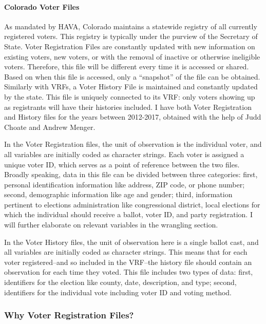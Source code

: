 \documentclass[]{article}
\let\oldparagraph\paragraph
\renewcommand{\paragraph}[1]{\oldparagraph{#1}\mbox{}}
\begin{document}
\paragraph{Colorado Voter Files}\label{colorado-voter-files}

As mandated by HAVA, Colorado maintains a statewide registry of all
currently registered voters. This registry is typically under the
purview of the Secretary of State. Voter Registration Files are
constantly updated with new information on existing voters, new voters,
or with the removal of inactive or otherwise ineligible voters.
Therefore, this file will be different every time it is accessed or
shared. Based on when this file is accessed, only a ``snapshot'' of the
file can be obtained. Similarly with VRFs, a Voter History File is
maintained and constantly updated by the state. This file is uniquely
connected to its VRF: only voters showing up as registrants will have
their histories included. I have both Voter Registration and History
files for the years between 2012-2017, obtained with the help of Judd
Choate and Andrew Menger.

In the Voter Registration files, the unit of observation is the
individual voter, and all variables are initially coded as character
strings. Each voter is assigned a unique voter ID, which serves as a
point of reference between the two files. Broadly speaking, data in this
file can be divided between three categories: first, personal
identification information like address, ZIP code, or phone number;
second, demographic information like age and gender; third, information
pertinent to elections administration like congressional district, local
elections for which the individual should receive a ballot, voter ID,
and party registration. I will further elaborate on relevant variables
in the wrangling section.

In the Voter History files, the unit of observation here is a single
ballot cast, and all variables are initially coded as character strings.
This means that for each voter registered--and so included in the
VRF--the history file should contain an observation for each time they
voted. This file includes two types of data: first, identifiers for the
election like county, date, description, and type; second, identifiers
for the individual vote including voter ID and voting method.

\subsubsection{Why Voter Registration
Files?}\label{why-voter-registration-files}
\end{document}
